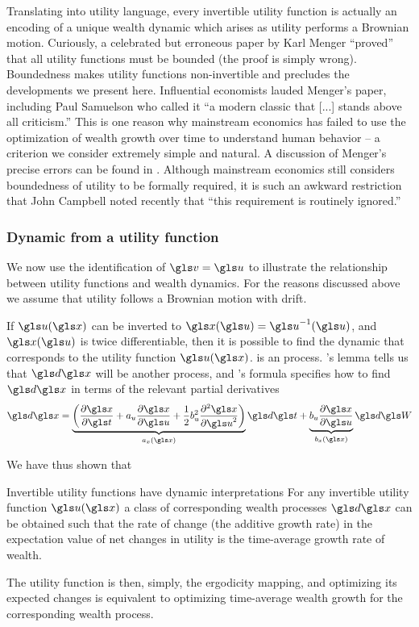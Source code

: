 Translating into utility language, every invertible utility 
function is actually an encoding of a unique wealth dynamic which arises as utility performs a 
Brownian motion. Curiously, a celebrated but erroneous paper by Karl Menger \cite{Menger1934} 
``proved'' that all utility functions must be bounded (the proof is simply wrong). Boundedness makes utility functions non-invertible and
precludes the developments we present here. Influential economists lauded Menger's paper, including Paul Samuelson \cite[p.~49]{Samuelson1977} who called it ``a modern classic that [...] stands above all criticism.'' This is one reason why mainstream economics
has failed to use the optimization of wealth growth over time to understand human behavior -- a criterion we consider extremely simple and natural. A  discussion of Menger's precise errors can be found in \cite[p.~7]{PetersGell-Mann2016}. Although mainstream economics still considers boundedness of utility to be formally required, it is such an awkward restriction that John Campbell noted recently \cite{Campbell2017} that ``this requirement is routinely ignored.''

\subsubsection{Dynamic from a utility function}
We now use the identification of $\gv=\gu$ to illustrate the relationship between utility functions and
wealth dynamics. For the reasons discussed above we assume that
utility follows a Brownian motion with drift. 

If $\gu(\x)$ can be inverted to $\x(\gu)=\gu^{-1}(\gu)$, and $\x(\gu)$ is twice differentiable,
then it is possible to find the dynamic that corresponds to the utility function
$\gu(\x)$.   is an \Ito process. \Ito's lemma tells us that $\gd\x$
will be another \Ito process, and \Ito's formula specifies how to find $
\gd\x$
in terms of the relevant partial derivatives
\begin{equation}
\gd\x = \underbrace{\left(\frac{\partial \x}{\partial \t}+a_u \frac{\partial \x}{\partial \gu} + \frac{1}{2}b_u^2\frac{\partial^2 \x}{\partial \gu^2}\right)}_{a_x(\x)}\gd\t + \underbrace{b_u \frac{\partial \x}{\partial \gu}}_{b_x(\x)} \gd\gW
\elabel{dx}
\end{equation}

We have thus shown that 
\begin{keypts}{Invertible utility functions have dynamic interpretations}
For any invertible utility function $\gu(\x)$ a class of corresponding
wealth processes $\gd\x$ can be obtained such that the rate of
change (\ie the additive growth rate) in the expectation value of net changes 
in utility is the time-average growth rate of wealth.
\end{keypts}
The utility function is then, simply, the ergodicity mapping, and optimizing its expected changes
is equivalent to optimizing time-average wealth growth for the
corresponding wealth process. 

